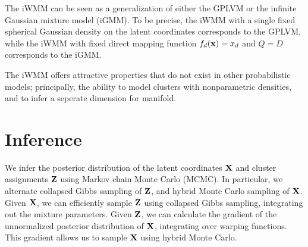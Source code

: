 The iWMM can be seen as a generalization of either the GPLVM or the infinite Gaussian mixture model (iGMM).
To be precise, the iWMM with a single fixed spherical Gaussian density on the latent coordinates corresponds to the GPLVM, while the iWMM with fixed direct mapping function $f_{d}({\bf{x}})=x_{d}$ and 
$Q=D$ corresponds to the iGMM.

The iWMM offers attractive properties that do not exist in other probabilistic models; principally, the ability to model clusters with nonparametric densities, and to infer a seperate dimension for manifold.





\section{Inference}

We infer the posterior distribution of the latent coordinates $\mathbf{X}$ and cluster assignments $\mathbf{Z}$ using Markov chain Monte Carlo (MCMC).
In particular, we alternate collapsed Gibbs sampling of $\mathbf{Z}$, and hybrid Monte Carlo sampling of $\mathbf{X}$.
Given $\mathbf{X}$,
we can efficiently sample $\mathbf{Z}$ using collapsed Gibbs sampling, integrating out the mixture parameters.
Given $\mathbf{Z}$, we can calculate the gradient of the unnormalized posterior distribution of $\mathbf{X}$, integrating over warping functions.
This gradient allows us to sample $\mathbf{X}$ using hybrid Monte Carlo.

